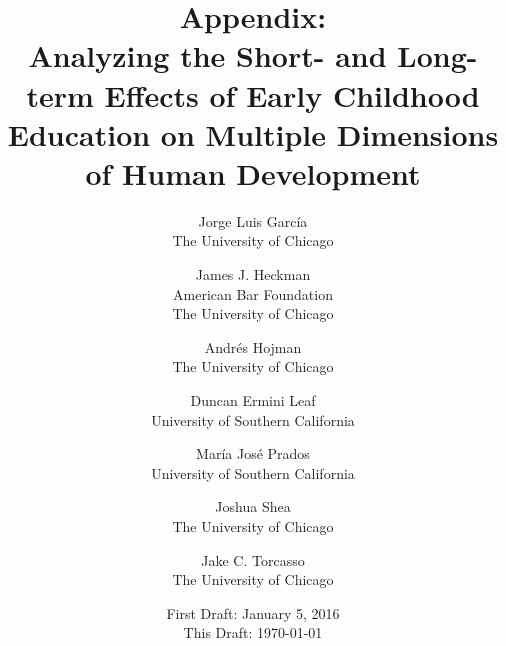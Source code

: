 





\title{\Large \textbf{Appendix: \\ Analyzing the Short- and Long-term Effects of Early Childhood Education on Multiple Dimensions of Human Development}}

\author{
Jorge Luis Garc\'{i}a\\
The University of Chicago \and
James J. Heckman \\
American Bar Foundation \\
The University of Chicago \and
Andr\'{e}s Hojman\\
The University of Chicago \and
Duncan Ermini Leaf \\ 
University of Southern California \and
Mar\'{i}a Jos\'{e} Prados \\
University of Southern California \and
Joshua Shea \\
The University of Chicago \and 
Jake C. Torcasso \\
The University of Chicago}
\date{First Draft: January 5, 2016\\ This Draft: \today}
\maketitle
\thispagestyle{empty}

\tableofcontents
\listoffigures
\listoftables
\pagebreak
\doublespacing

